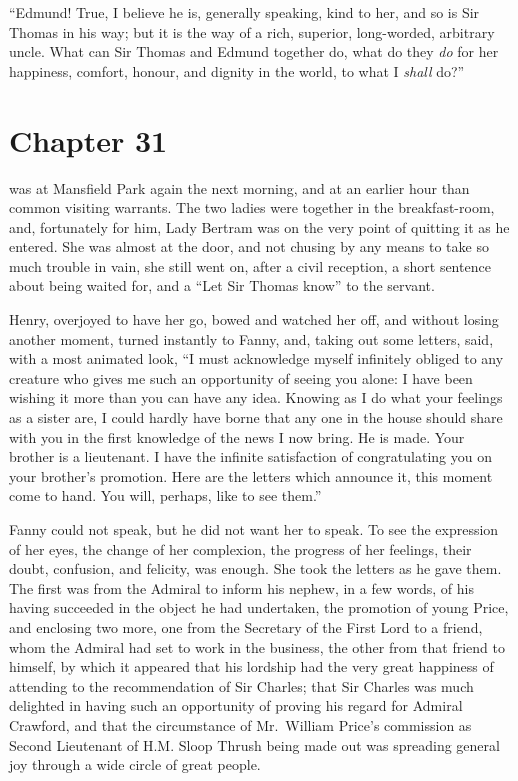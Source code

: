 ``Edmund!  True, I believe he is, generally speaking,
kind to her, and so is Sir Thomas in his way; but it is
the way of a rich, superior, long-worded, arbitrary uncle.
What can Sir Thomas and Edmund together do, what do they
\emph{do} for her happiness, comfort, honour, and dignity in
the world, to what I \emph{shall} do?''



\chapter{Chapter 31}

 was at Mansfield Park again the next morning,
and at an earlier hour than common visiting warrants.
The two ladies were together in the breakfast-room, and,
fortunately for him, Lady Bertram was on the very point
of quitting it as he entered.  She was almost at the door,
and not chusing by any means to take so much trouble in vain,
she still went on, after a civil reception, a short sentence
about being waited for, and a ``Let Sir Thomas know''
to the servant.

Henry, overjoyed to have her go, bowed and watched her off,
and without losing another moment, turned instantly to Fanny,
and, taking out some letters, said, with a most animated look,
``I must acknowledge myself infinitely obliged to any creature
who gives me such an opportunity of seeing you alone:
I have been wishing it more than you can have any idea.
Knowing as I do what your feelings as a sister are, I could
hardly have borne that any one in the house should share
with you in the first knowledge of the news I now bring.
He is made.  Your brother is a lieutenant.  I have
the infinite satisfaction of congratulating you on your
brother's promotion.  Here are the letters which announce it,
this moment come to hand.  You will, perhaps, like to see them.''

Fanny could not speak, but he did not want her to speak.
To see the expression of her eyes, the change
of her complexion, the progress of her feelings,
their doubt, confusion, and felicity, was enough.
She took the letters as he gave them.  The first was
from the Admiral to inform his nephew, in a few words,
of his having succeeded in the object he had undertaken,
the promotion of young Price, and enclosing two more,
one from the Secretary of the First Lord to a friend,
whom the Admiral had set to work in the business,
the other from that friend to himself, by which it
appeared that his lordship had the very great happiness
of attending to the recommendation of Sir Charles;
that Sir Charles was much delighted in having such an
opportunity of proving his regard for Admiral Crawford,
and that the circumstance of Mr.\ William Price's commission
as Second Lieutenant of H.M. Sloop Thrush being made
out was spreading general joy through a wide circle
of great people.

